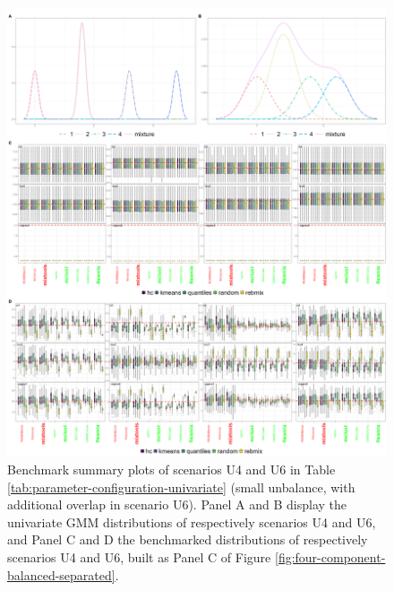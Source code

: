 \newpage
\begin{figure}

{\centering \includegraphics[width=1\linewidth]{figs/univariate/univariate_midbalanced} 

}

\caption{Benchmark summary plots of scenarios U4 and U6 in Table \ref{tab:parameter-configuration-univariate} (small unbalance, with additional overlap in scenario U6). Panel A and B display the univariate GMM distributions of respectively scenarios U4 and U6, and Panel C and D the benchmarked distributions of respectively scenarios U4 and U6, built as Panel C of Figure \ref{fig:four-component-balanced-separated}.}\label{fig:four-components-midbalanced}
\end{figure}

